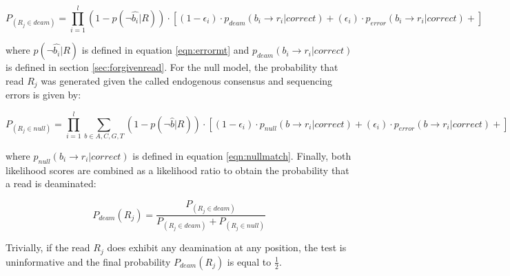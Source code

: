 \documentclass[a4paper,12pt]{article}
\begin{document}
\begin{equation}
P_(R_j \in deam)  = \prod_{i=1}^{l} (1-p(\neg \hat{b_i}|R)) \cdot 
[ (1-\epsilon_i) \cdot p_{deam}(b_i \to r_i | correct)
  + 
  (\epsilon_i) \cdot p_{error}(b_i \to r_i | correct) + 
]
\end{equation} 

\noindent where $p(\neg \hat{b_i}|R)$ is defined in equation \ref{eqn:errormt} and $p_{deam}(b_i \to r_i | correct)$  is defined in section \ref{sec:forgivenread}. For the null model, the probability that read $R_j$ was generated given the called endogenous consensus and sequencing errors is given by:

\begin{equation}
P_(R_j \in null)  = \prod_{i=1}^{l} \sum_{b \in {A,C,G,T} } (1-p(\neg \hat{b}|R)) \cdot 
[ (1-\epsilon_i) \cdot p_{null}(b \to r_i | correct)
  + 
  (\epsilon_i) \cdot p_{error}(b \to r_i | correct) + 
]
\end{equation} 

\noindent where $p_{null}(b_i \to r_i | correct)$  is defined in equation \ref{eqn:nullmatch}. Finally, both likelihood scores are combined as a likelihood ratio to obtain the probability that a read is deaminated:

\begin{equation}
P_{deam}(R_j) = \frac {P_(R_j \in deam)} {P_(R_j \in deam) +  P_(R_j \in null)}
\end{equation}

\noindent Trivially, if the read $R_j$ does exhibit any deamination at any position, the test is uninformative and the final probability $P_{deam}(R_j)$ is equal to $\frac {1} {2}$.


\end{document}
